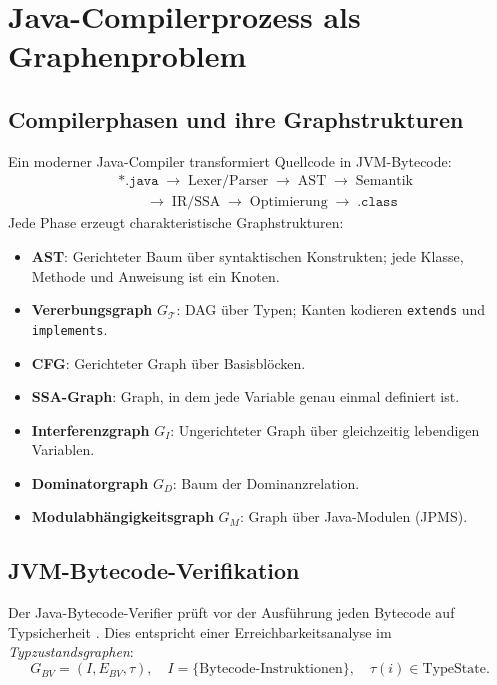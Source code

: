 ﻿\documentclass[a4paper,12pt]{article}
\theoremstyle{definition}
\begin{document}
\section{Java-Compilerprozess als Graphenproblem}

\subsection{Compilerphasen und ihre Graphstrukturen}

Ein moderner Java-Compiler transformiert Quellcode in JVM-Bytecode:
\begin{align*}
&\texttt{*.java}
\;\to\; \text{Lexer/Parser}
\;\to\; \text{AST}
\;\to\; \text{Semantik}\\
&\qquad\to\; \text{IR/SSA}
\;\to\; \text{Optimierung}
\;\to\; \texttt{.class}
\end{align*}
Jede Phase erzeugt charakteristische Graphstrukturen:
\begin{itemize}
    \item \textbf{AST}: Gerichteter Baum \"uber syntaktischen
          Konstrukten; jede Klasse, Methode und Anweisung ist ein
          Knoten.
    \item \textbf{Vererbungsgraph} $G_{\mathcal{T}}$: DAG \"uber
          Typen; Kanten kodieren \texttt{extends} und
          \texttt{implements}.
    \item \textbf{CFG}: Gerichteter Graph \"uber Basisbl\"ocken.
    \item \textbf{SSA-Graph}: Graph, in dem jede Variable genau
          einmal definiert ist.
    \item \textbf{Interferenzgraph} $G_I$: Ungerichteter Graph
          \"uber gleichzeitig lebendigen Variablen.
    \item \textbf{Dominatorgraph} $G_D$: Baum der Dominanzrelation.
    \item \textbf{Modulabh\"angigkeitsgraph} $G_M$: Graph \"uber
          Java-Modulen (JPMS).
\end{itemize}

\subsection{JVM-Bytecode-Verifikation}

Der Java-Bytecode-Verifier pr\"uft vor der Ausf\"uhrung jeden Bytecode
auf Typsicherheit \cite{leroy2003}.  Dies entspricht einer
Erreichbarkeitsanalyse im \emph{Typzustandsgraphen}:
\[
G_{BV} = (I, E_{BV}, \tau),\quad
I = \{\text{Bytecode-Instruktionen}\},\quad
\tau(i) \in \text{TypeState}.
\]
\end{document}
